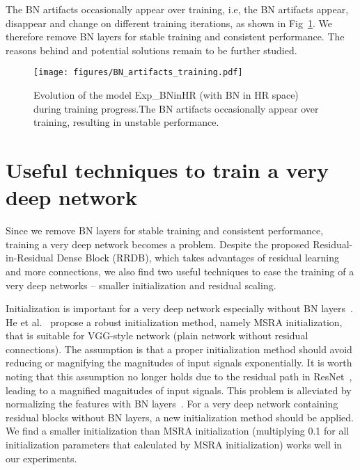 \documentclass[runningheads]{llncs}
\begin{document}
The BN artifacts occasionally appear over training, i.e, the BN artifacts appear, disappear and change on different 
training iterations, as shown in Fig~\ref{fig:BN_artifacts_training}.
We therefore remove BN layers for stable training and consistent performance.
The reasons behind and potential solutions remain to be further studied.

\begin{figure}[htbp]
	\vspace{-0.4cm}
	\begin{center}
\texttt{[image: figures/BN\_artifacts\_training.pdf]}
	\end{center}
	\vspace{-0.4cm}
	\caption{Evolution of the model Exp\_BNinHR (with BN in HR space) during training progress.The BN artifacts 
		occasionally appear over training, resulting in unstable  performance.}
	\vspace{-0.4cm}
	\label{fig:BN_artifacts_training}
\end{figure}


\section{Useful techniques to train a very deep network} \label{sec:useful_techniques}

Since we remove BN layers for stable training and consistent performance, training a very deep network becomes a 
problem. 
Despite the proposed Residual-in-Residual Dense Block (RRDB), which takes advantages of residual learning and more 
connections, we also find two useful techniques to ease the training of a very deep networks -- smaller initialization 
and 
residual scaling. 


Initialization is important for a very deep network especially without BN 
layers~\cite{glorot2010understanding,he2015delving}.
He et al.~\cite{he2015delving} propose a robust initialization method, namely MSRA initialization, 
that is suitable for VGG-style network (plain network \mbox{without} residual connections). 
The assumption is that a proper initialization method should avoid reducing or magnifying the magnitudes of input 
signals exponentially.
It is worth noting that this assumption no longer holds due to the residual path in ResNet~\cite{he2016deep}, leading 
to a magnified magnitudes of input signals.
This problem is alleviated by normalizing the features with BN layers~\cite{ioffe2015batch}.
For a very deep network containing residual blocks without BN layers, a new initialization method should be applied. 
We find a smaller initialization than MSRA initialization (multiplying 0.1 for all initialization parameters 
that calculated by MSRA initialization) works well in our experiments.
\end{document}

